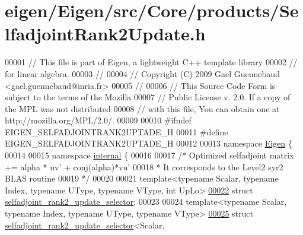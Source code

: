 \hypertarget{eigen_2_eigen_2src_2_core_2products_2_selfadjoint_rank2_update_8h_source}{}\section{eigen/\+Eigen/src/\+Core/products/\+Selfadjoint\+Rank2\+Update.h}
\label{eigen_2_eigen_2src_2_core_2products_2_selfadjoint_rank2_update_8h_source}

\begin{DoxyCode}
00001 \textcolor{comment}{// This file is part of Eigen, a lightweight C++ template library}
00002 \textcolor{comment}{// for linear algebra.}
00003 \textcolor{comment}{//}
00004 \textcolor{comment}{// Copyright (C) 2009 Gael Guennebaud <gael.guennebaud@inria.fr>}
00005 \textcolor{comment}{//}
00006 \textcolor{comment}{// This Source Code Form is subject to the terms of the Mozilla}
00007 \textcolor{comment}{// Public License v. 2.0. If a copy of the MPL was not distributed}
00008 \textcolor{comment}{// with this file, You can obtain one at http://mozilla.org/MPL/2.0/.}
00009 
00010 \textcolor{preprocessor}{#ifndef EIGEN\_SELFADJOINTRANK2UPTADE\_H}
00011 \textcolor{preprocessor}{#define EIGEN\_SELFADJOINTRANK2UPTADE\_H}
00012 
00013 \textcolor{keyword}{namespace }\hyperlink{namespace_eigen}{Eigen} \{ 
00014 
00015 \textcolor{keyword}{namespace }\hyperlink{namespaceinternal}{internal} \{
00016 
00017 \textcolor{comment}{/* Optimized selfadjoint matrix += alpha * uv' + conj(alpha)*vu'}
00018 \textcolor{comment}{ * It corresponds to the Level2 syr2 BLAS routine}
00019 \textcolor{comment}{ */}
00020 
00021 \textcolor{keyword}{template}<\textcolor{keyword}{typename} Scalar, \textcolor{keyword}{typename} Index, \textcolor{keyword}{typename} UType, \textcolor{keyword}{typename} VType, \textcolor{keywordtype}{int} UpLo>
\hyperlink{struct_eigen_1_1internal_1_1selfadjoint__rank2__update__selector}{00022} \textcolor{keyword}{struct }\hyperlink{struct_eigen_1_1internal_1_1selfadjoint__rank2__update__selector}{selfadjoint\_rank2\_update\_selector};
00023 
00024 \textcolor{keyword}{template}<\textcolor{keyword}{typename} Scalar, \textcolor{keyword}{typename} Index, \textcolor{keyword}{typename} UType, \textcolor{keyword}{typename} VType>
\hyperlink{struct_eigen_1_1internal_1_1selfadjoint__rank2__update__selector_3_01_scalar_00_01_index_00_01_uf491e100c52e514fc778fd2dd4e730f2}{00025} \textcolor{keyword}{struct }\hyperlink{struct_eigen_1_1internal_1_1selfadjoint__rank2__update__selector}{selfadjoint\_rank2\_update\_selector}<Scalar,

\end{DoxyCode}
